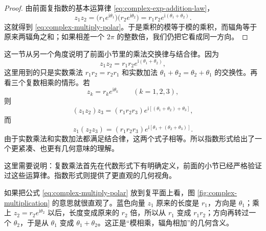 \begin{proof}
由前面复指数的基本运算律 \eqref{eq:complex-exp-addition-law}，
\[
z_1z_2=\bigl(r_1e^{\mathrm{i}\theta_1}\bigr)\bigl(r_2e^{\mathrm{i}\theta_2}\bigr)
=r_1r_2e^{\mathrm{i}(\theta_1+\theta_2)}.
\]
这就得到 \eqref{eq:complex-multiply-polar}。于是乘积的模等于模的乘积，而辐角等于原来两辐角之和；如果相差一个 $2\pi$ 的整数倍，我们仍把它看成同一方向。
\end{proof}

\begin{zhu}{}{}
这一节从另一个角度说明了前面小节里的乘法交换律与结合律。因为
\[
z_1z_2=r_1r_2e^{\mathrm{i}(\theta_1+\theta_2)},
\]
这里用到的只是实数乘法 $r_1r_2=r_2r_1$ 和实数加法 $\theta_1+\theta_2=\theta_2+\theta_1$ 的交换性。再看三个复数相乘的情形。若
\[
z_k=r_ke^{\mathrm{i}\theta_k}\qquad (k=1,2,3),
\]
则
\[
(z_1z_2)z_3=(r_1r_2r_3)e^{\mathrm{i}[(\theta_1+\theta_2)+\theta_3]},
\]
而
\[
z_1(z_2z_3)=(r_1r_2r_3)e^{\mathrm{i}[\theta_1+(\theta_2+\theta_3)]}.
\]
由于实数乘法和实数加法都满足结合律，这两个式子相等。所以指数形式给出了一个更紧凑、也更有几何意味的理解。

这里需要说明：复数乘法首先在代数形式下有明确定义，前面的小节已经严格验证过这些运算律。指数形式则提供了更直观的几何视角。
\end{zhu}

如果把公式 \eqref{eq:complex-multiply-polar} 放到复平面上看，图 \ref{fig:complex-multiplication} 的意思就很直观了。蓝色向量 $z_1$ 原来的长度是 $r_1$，方向是 $\theta_1$；乘上 $z_2=r_2e^{\mathrm{i}\theta_2}$ 以后，长度变成原来的 $r_2$ 倍，所以从 $r_1$ 变成 $r_1r_2$；方向再转过一个 $\theta_2$，于是从 $\theta_1$ 变成 $\theta_1+\theta_2$。这正是``模相乘，辐角相加''的几何含义。

